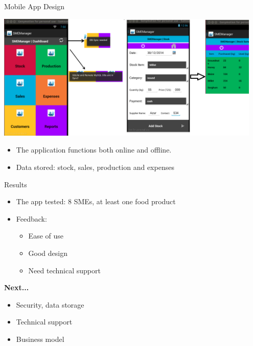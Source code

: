 \documentclass{beamer}
\begin{document}
\begin{frame}{Mobile App Design}
	 	\begin{center}
	     \includegraphics[width=0.95\textwidth]{figs/smeManager}
	     \end{center}
	\begin{itemize}
	    \item The application functions both online and offline.
	     \item Data stored: stock, sales, production and expenses
	     \end{itemize}
	    
\end{frame}

\begin{frame}{Results}
		\begin{itemize}
	    \item The app tested: 8 SMEs, at least one food product
		\item Feedback:
	\begin{itemize}
	    \item Ease of use
		\item Good design 
		\item Need technical support
		\end{itemize}
	\end{itemize}

\large{\textbf {Next...}}
	\begin{itemize}
	\item Security, data storage
	\item Technical support 
	\item Business model
	     \end{itemize}
\end{frame}
\end{document}
